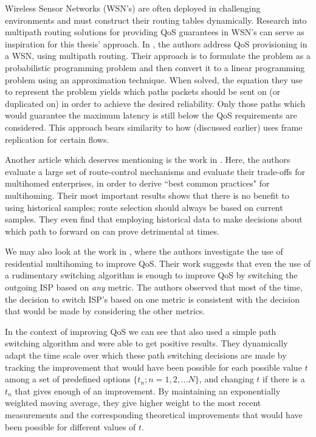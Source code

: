 Wireless Sensor Networks (WSN's) are often deployed in challenging environments and must construct their routing tables dynamically. Research into multipath routing solutions for providing QoS guarantees in WSN's can serve as inspiration for this thesis' approach. In  \cite{huang2008multiconstrained}, the authors address QoS provisioning in a WSN, using multipath routing. Their approach is to formulate the problem as a probabilistic programming problem and then convert it to a linear programming problem using an approximation technique. When solved, the equation they use to represent the problem yields which paths packets should be sent on (or duplicated on) in order to achieve the desired reliability. Only those paths which would guarantee the maximum latency is still below the QoS requirements are considered. This approach bears similarity to how \cite{prados2021asynchronous} (discussed earlier) uses frame replication for certain flows.

Another article which deserves mentioning is the work in \cite{akella2008performance}. Here, the authors evaluate a large set of route-control mechanisms and evaluate their trade-offs for multihomed enterprises, in order to derive “best common practices" for multihoming. Their most important results shows that there is no benefit to using historical samples; route selection should always be based on current samples. They even find that employing historical data to make decisions about which path to forward on can prove detrimental at times.

We may also look at the work in \cite{habib2007improving}, where the authors investigate the use of residential multihoming to improve QoS. Their work suggests that even the use of a rudimentary switching algorithm is enough to improve QoS by switching the outgoing ISP based on \textit{any} metric. The authors observed that most of the time, the decision to switch ISP's based on one metric is consistent with the decision that would be made by considering the other metrics.

In the context of improving QoS we can see that \cite{tao2005improving} also used a simple path switching algorithm and were able to get positive results. They dynamically adapt the time scale over which these path switching decisions are made by tracking the improvement that would have been possible for each possible value $t$ among a set of predefined options $\{t_n;n = 1,2, ... N\}$, and changing $t$ if there is a $t_n$ that gives enough of an improvement. By maintaining an exponentially weighted moving average, they give higher weight to the most recent measurements and the corresponding theoretical improvements that would have been possible for different values of $t$.

